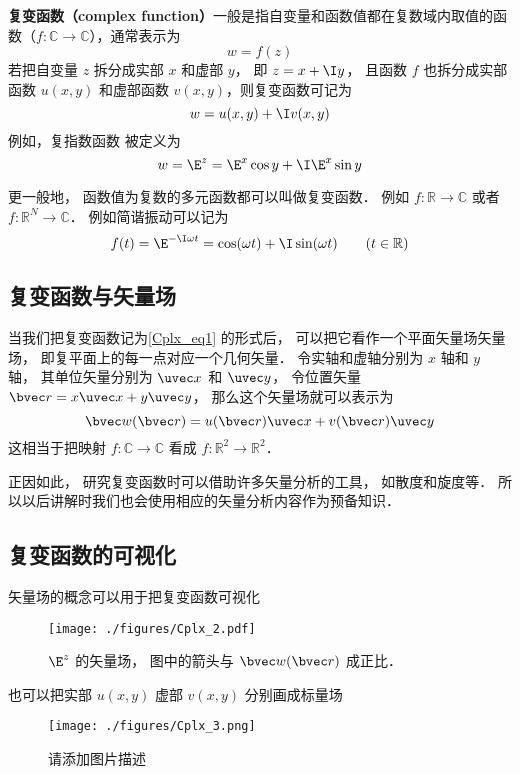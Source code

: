 
\textbf{复变函数（complex function）}一般是指自变量和函数值都在复数域内取值的函数（$f:\mathbb C \to \mathbb C$），通常表示为
\begin{equation}
w = f(z)
\end{equation}
若把自变量 $z$ 拆分成实部 $x$ 和虚部 $y$， 即 $z = x + \I y$， 且函数 $f$ 也拆分成实部函数 $u(x,y)$ 和虚部函数 $v(x,y)$，则复变函数可记为
\begin{equation}\label{Cplx_eq1}
w = u(x,y) + \I v(x,y)
\end{equation}
例如，复指数函数 被定义为
\begin{equation}\label{Cplx_eq3}
w = \E^z = \E^x \cos y + \I \E^x\sin y
\end{equation}


更一般地， 函数值为复数的多元函数都可以叫做复变函数． 例如 $f: \mathbb R \to \mathbb C$ 或者 $f:\mathbb R^N \to \mathbb C$． 例如简谐振动可以记为
\begin{equation}
f(t) = \E^{-\I \omega t} = \cos(\omega t) + \I \sin(\omega t) \qquad (t \in \mathbb R)
\end{equation}

\subsection{复变函数与矢量场}
当我们把复变函数记为\autoref{Cplx_eq1} 的形式后， 可以把它看作一个平面矢量场矢量场， 即复平面上的每一点对应一个几何矢量． 令实轴和虚轴分别为 $x$ 轴和 $y$ 轴， 其单位矢量分别为 $\uvec x$ 和 $\uvec y$， 令位置矢量 $\bvec r = x \uvec x + y \uvec y$， 那么这个矢量场就可以表示为
\begin{equation}
\bvec w(\bvec r) = u(\bvec r) \uvec x + v(\bvec r) \uvec y
\end{equation}
这相当于把映射 $f:\mathbb C \to \mathbb C$ 看成 $f: \mathbb R^2 \to \mathbb R^2$．

正因如此， 研究复变函数时可以借助许多矢量分析的工具， 如散度和旋度等． 所以以后讲解时我们也会使用相应的矢量分析内容作为预备知识．

\subsection{复变函数的可视化}
矢量场的概念可以用于把复变函数可视化
\begin{figure}[ht]
\centering
\texttt{[image: ./figures/Cplx\_2.pdf]}
\caption{$\E^z$ 的矢量场， 图中的箭头与 $\bvec w(\bvec r)$ 成正比．} \label{Cplx_fig2}
\end{figure}
也可以把实部 $u(x,y)$ 虚部 $v(x, y)$ 分别画成标量场
\begin{figure}[ht]
\centering
\texttt{[image: ./figures/Cplx\_3.png]}
\caption{请添加图片描述} \label{Cplx_fig3}
\end{figure}


